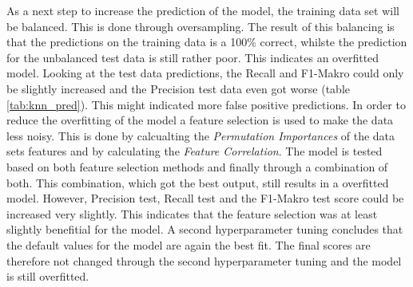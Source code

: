 As a next step to increase the prediction of the model, the training data set will be balanced. This is done through oversampling. The result of this balancing is that the predictions on the training data is a 100\% correct, whilste the prediction for the unbalanced test data is still rather poor. This indicates an overfitted model. Looking at the test data predictions, the Recall and F1-Makro could only be slightly increased and the Precision test data even got worse (table \ref{tab:knn_pred}). This might indicated more false positive predictions. In order to reduce the overfitting of the model a feature selection is used to make the data less noisy. This is done by calcualting the \textit{Permutation Importances} of the data sets features and by calculating the \textit{Feature Correlation}. The model is tested based on both feature selection methods and finally through a combination of both. This combination, which got the best output, still results in a overfitted model. However, Precision test, Recall test and the F1-Makro test score could be increased very slightly. This indicates that the feature selection was at least slightly benefitial for the model. A second hyperparameter tuning concludes that the default values for the model are again the best fit. The final scores are therefore not changed through the second hyperparameter tuning and the model is still overfitted.


